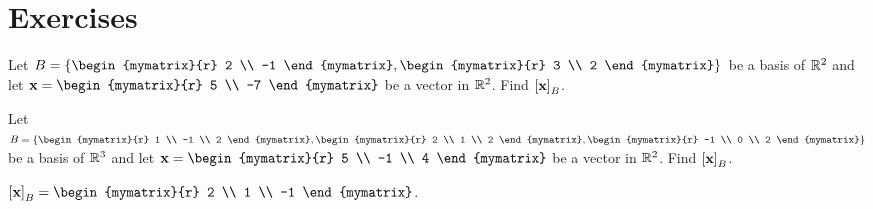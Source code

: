 \section*{Exercises}

\begin{ex}
  Let $B = \set{\begin{mymatrix}{r} 2 \\ -1 \end{mymatrix},
    \begin{mymatrix}{r} 3 \\ 2 \end{mymatrix}}$ be a basis of $\mathbb{R}^2$
  and let $\vect{x} = \begin{mymatrix}{r} 5 \\ -7 \end{mymatrix}$ be a
  vector in $\mathbb{R}^2$. Find $\coord{\vect{x}}_B$.
\end{ex}

\begin{ex}
  Let $B = \set{\begin{mymatrix}{r} 1 \\ -1 \\ 2 \end{mymatrix},
    \begin{mymatrix}{r} 2 \\ 1 \\ 2 \end{mymatrix},
    \begin{mymatrix}{r} -1 \\ 0 \\ 2 \end{mymatrix}}$ be a basis of
  $\mathbb{R}^3$ and let
  $\vect{x} = \begin{mymatrix}{r} 5 \\ -1 \\ 4 \end{mymatrix}$ be a
  vector in $\mathbb{R}^2$. Find $\coord{\vect{x}}_B$.
  \begin{sol}
    $\coord{\vect{x}}_B
    = \begin{mymatrix}{r} 2 \\ 1 \\ -1 \end{mymatrix}$.
  \end{sol}
\end{ex}

